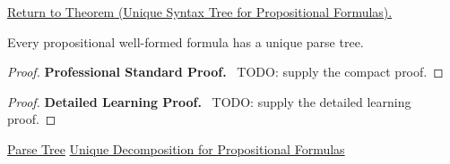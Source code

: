 \newpage
{}
\label{prf:unique-syntax-tree-propositional-formulas}

\begin{remark*}[Return]
\hyperref[thm:unique-syntax-tree-propositional-formulas]{Return to Theorem (Unique Syntax Tree for Propositional Formulas).}
\end{remark*}

\begin{theorem*}
Every propositional well-formed formula has a unique parse tree.
\end{theorem*}

\begin{proof}
\textbf{Professional Standard Proof.}~
TODO: supply the compact proof.
\end{proof}

\begin{proof}
\textbf{Detailed Learning Proof.}~
TODO: supply the detailed learning proof.
\end{proof}

\begin{remark*}
\end{remark*}

\begin{dependencies}
\hyperref[def:parse-tree-propositional-logic]{Parse Tree}
\hyperref[thm:unique-decomposition-propositional-formulas]{Unique Decomposition for Propositional Formulas}
\end{dependencies}

\clearpage
